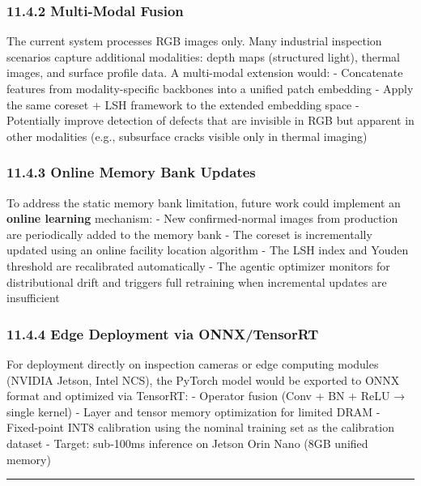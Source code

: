 \subsubsection{11.4.2 Multi-Modal Fusion}\label{multi-modal-fusion}

The current system processes RGB images only. Many industrial inspection scenarios capture additional modalities: depth maps (structured light), thermal images, and surface profile data. A multi-modal extension would: - Concatenate features from modality-specific backbones into a unified patch embedding - Apply the same coreset + LSH framework to the extended embedding space - Potentially improve detection of defects that are invisible in RGB but apparent in other modalities (e.g., subsurface cracks visible only in thermal imaging)

\subsubsection{11.4.3 Online Memory Bank Updates}\label{online-memory-bank-updates}

To address the static memory bank limitation, future work could implement an \textbf{online learning} mechanism: - New confirmed-normal images from production are periodically added to the memory bank - The coreset is incrementally updated using an online facility location algorithm - The LSH index and Youden threshold are recalibrated automatically - The agentic optimizer monitors for distributional drift and triggers full retraining when incremental updates are insufficient

\subsubsection{11.4.4 Edge Deployment via ONNX/TensorRT}\label{edge-deployment-via-onnxtensorrt}

For deployment directly on inspection cameras or edge computing modules (NVIDIA Jetson, Intel NCS), the PyTorch model would be exported to ONNX format and optimized via TensorRT: - Operator fusion (Conv + BN + ReLU → single kernel) - Layer and tensor memory optimization for limited DRAM - Fixed-point INT8 calibration using the nominal training set as the calibration dataset - Target: sub-100ms inference on Jetson Orin Nano (8GB unified memory)

\begin{center}\rule{0.5\linewidth}{0.5pt}\end{center}

